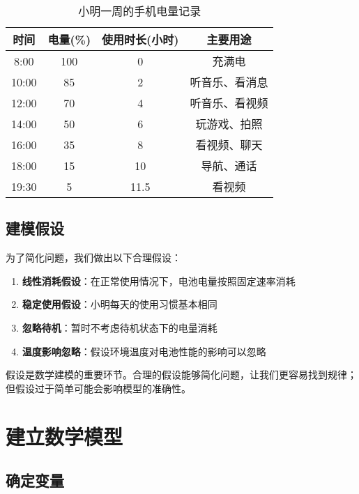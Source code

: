 \begin{table}[htbp]
    \centering
    \caption{小明一周的手机电量记录}
    
    \label{tab:battery-data}
    \begin{tabular}{@{}cccc@{}}
        \toprule
        时间 & 电量(\%) & 使用时长(小时) & 主要用途 \\
        \midrule
        8:00 & 100 & 0 & 充满电 \\
        10:00 & 85 & 2 & 听音乐、看消息 \\
        12:00 & 70 & 4 & 听音乐、看视频 \\
        14:00 & 50 & 6 & 玩游戏、拍照 \\
        16:00 & 35 & 8 & 看视频、聊天 \\
        18:00 & 15 & 10 & 导航、通话 \\
        19:30 & 5 & 11.5 & 看视频 \\
        \bottomrule
    \end{tabular}
\end{table}

\subsection{建模假设}

为了简化问题，我们做出以下合理假设：

\begin{enumerate}
    \item \textbf{线性消耗假设}：在正常使用情况下，电池电量按照固定速率消耗
    \item \textbf{稳定使用假设}：小明每天的使用习惯基本相同
    \item \textbf{忽略待机}：暂时不考虑待机状态下的电量消耗
    \item \textbf{温度影响忽略}：假设环境温度对电池性能的影响可以忽略
\end{enumerate}

\begin{warningbox}[title=关于假设]
假设是数学建模的重要环节。合理的假设能够简化问题，让我们更容易找到规律；但假设过于简单可能会影响模型的准确性。
\end{warningbox}

\section{建立数学模型}\label{sec:build-model}

\subsection{确定变量}

